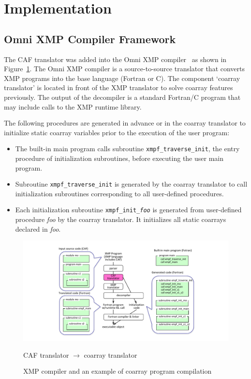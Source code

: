 \section{Implementation}\label{sec:implement}

\subsection{Omni XMP Compiler Framework}

The CAF translator was added into the Omni XMP compiler~\cite{omni} 
as shown in Figure~\ref{fig:translator}.
The Omni XMP compiler is a source-to-source translator that converts XMP programs 
into the base language (Fortran or C).  The component `coarray translator' is 
located in front of the XMP translator to solve coarray features previously. 
The output of the decompiler is a standard Fortran/C program that may include 
calls to the XMP runtime library.

The following procedures are generated in advance or in the coarray translator
to initialize static coarray variables prior to the execution of the user program:
\begin{itemize}
\item
The built-in main program calls subroutine {\tt xmpf\_traverse\_init},
the entry procedure of initialization subroutines, before executing the
user main program.
\item
Subroutine {\tt xmpf\_traverse\_init} is generated by the coarray translator 
to call initialization subroutines corresponding to all user-defined procedures.
\item
Each initialization subroutine {\tt xmpf\_init\_{\it foo}} is generated from 
user-defined procedure {\it foo} by the coarray translator. 
It initializes all static coarrays declared in {\it foo}.
\end{itemize}

\begin{figure}[tbh]
 \begin{center}
  \includegraphics[trim=30mm 0mm 20mm 7mm, scale=1.0]{figs/translator-tmp.pdf}
  \caption{XMP compiler and an example of coarray program compilation}
  \label{fig:translator}
  CAF translator $\rightarrow$ coarray translator
 \end{center}
\end{figure}


